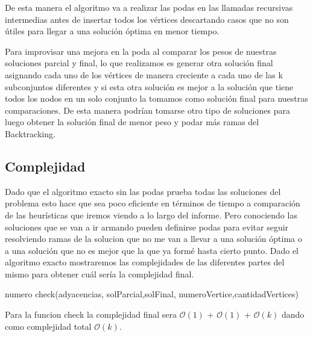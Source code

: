 De esta manera el algoritmo va a realizar las podas en las llamadas recursivas intermedias antes de insertar todos los vértices descartando casos que no son útiles para llegar a una solución óptima en menor tiempo.

Para improvisar una mejora en la poda al comparar los pesos de nuestras soluciones parcial y final, lo que realizamos es generar otra solución final asignando cada uno de los vértices de manera creciente a cada uno de las k subconjuntos diferentes y si esta otra solución es mejor a la solución que tiene todos los nodos en un solo conjunto la tomamos como solución final para nuestras comparaciones.
De esta manera podrían tomarse otro tipo de soluciones para luego obtener la solución final de menor peso y podar más ramas del Backtracking.	

\subsection{Complejidad}
Dado que el algoritmo exacto sin las podas prueba todas las soluciones del problema esto hace que sea poco eficiente en términos de tiempo a comparación de las heurísticas que iremos viendo a lo largo del informe. Pero conociendo las soluciones que se van a ir armando pueden definirse podas para evitar seguir resolviendo ramas de la solucion que no me van a llevar a una solución óptima o a una solución que no es mejor que la que ya formé hasta cierto punto.
Dado el algoritmo exacto mostraremos las complejidades de las diferentes partes del mismo para obtener cuál sería la complejidad final.

\begin{algorithm}
  \begin{algorithmic}[1]\parskip=1mm
 \caption{numero check(adyacencias, solParcial,solFinal, numeroVertice,cantidadVertices)}
  \end{algorithmic}
  \end{algorithm}

Para la funcion check la complejidad final sera $\mathcal{O}(1)$ + $\mathcal{O}(1)$ + $\mathcal{O}(k)$ dando como complejidad total $\mathcal{O}(k)$.

